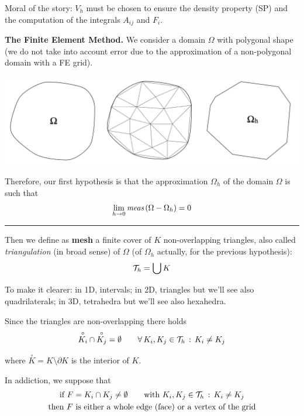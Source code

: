 Moral of the story: $V_h$ must be chosen to ensure the density property (SP) and the computation of the integrals $A_{ij}$ and $F_i$.

\newpage

\textbf{The Finite Element Method.} We consider a domain $\Omega$ with polygonal shape (we do not take into account error due to the approximation of a non-polygonal domain with a FE grid). 
\begin{Figure}
    \centering
    \includegraphics[width=\linewidth]{images/poly_shapes}
\end{Figure}

Therefore, our first hypothesis is that the approximation $\Omega_h$ of the domain $\Omega$ is such that
\begin{equation*}
\lim_{h\to 0} \emph{meas}\,(\Omega-\Omega_h)=0
\end{equation*}

\rule{0.47\textwidth}{0.2pt}

\smallskip

Then we define as \textbf{mesh} a finite cover of $K$ non-overlapping triangles, also called \emph{triangulation} (in broad sense) of $\Omega$ (of $\Omega_h$ actually, for the previous hypothesis): 
\begin{equation*}
\mathcal{T}_h=\bigcup K
\end{equation*}

To make it clearer: in 1D, intervals; in 2D, triangles but we'll see also quadrilaterals; in 3D, tetrahedra but we'll see also hexahedra.

Since the triangles are non-overlapping there holds
\begin{equation*}
\overset{\circ}{K_i}\cap \overset{\circ}{K_j} = \emptyset\qquad \forall\,K_i,K_j\in\mathcal{T}_h\,:\,K_i\neq K_j
\end{equation*}

where $\overset{\circ}{K}=K\setminus\partial K$ is the interior of $K$.

In addiction, we suppose that 
\begin{equation*}
\begin{gathered}
\text{if }F=K_i\cap K_j\neq \emptyset \qquad \text{with }K_i,K_j\in\mathcal{T}_h\,:\,K_i\neq K_j \\
\text{then }F\text{ is either a whole edge (face) or a vertex of the grid}
\end{gathered}
\end{equation*}

